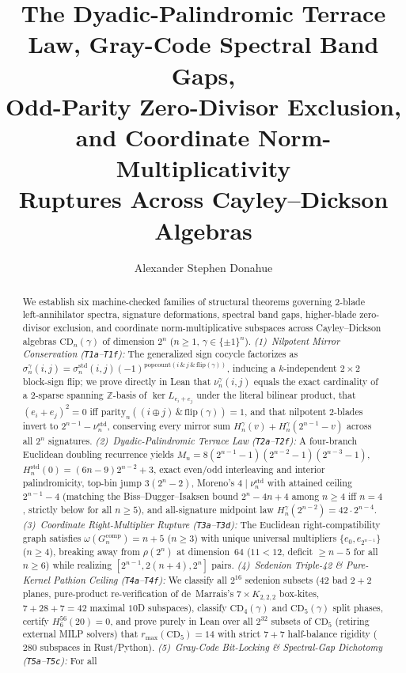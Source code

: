 \documentclass[11pt,reqno]{amsart}
\title[Terrace Law, Gray-Code Band Gaps, Odd-Parity Exclusion \& Ruptures]{%
  The Dyadic-Palindromic Terrace Law, Gray-Code Spectral Band Gaps,\\
  Odd-Parity Zero-Divisor Exclusion, and Coordinate Norm-Multiplicativity\\
  Ruptures Across Cayley--Dickson Algebras%
}
\author{Alexander Stephen Donahue}
\theoremstyle{plain}
\theoremstyle{definition}
\theoremstyle{remark}
\newcommand{\CD}{\mathrm{CD}}
\newcommand{\Z}{\mathbb{Z}}
\newcommand{\std}{\mathrm{std}}
\newcommand{\comp}{\mathrm{comp}}
\newcommand{\pop}{\mathrm{popcount}}
\newcommand{\parbit}{\mathrm{parity}}
\newcommand{\flip}{\mathrm{flip}}
\begin{document}
\begin{abstract}
We establish six machine-checked families of structural theorems governing $2$-blade
left-annihilator spectra, signature deformations, spectral band gaps, higher-blade zero-divisor
exclusion, and coordinate norm-multiplicative subspaces across Cayley--Dickson algebras
$\CD_n(\gamma)$ of dimension $2^n$ ($n \ge 1$, $\gamma \in \{\pm 1\}^n$).
\emph{(1)~Nilpotent Mirror Conservation (\texttt{T1a}--\texttt{T1f}):} The generalized sign
cocycle factorizes as $\sigma_n^\gamma(i,j) = \sigma_n^{\std}(i,j)(-1)^{\pop(i\,\&\,j\,\&\,\flip(\gamma))}$,
inducing a $k$-independent $2\times 2$ block-sign flip; we prove directly in Lean that
$\nu_n^\gamma(i,j)$ equals the exact cardinality of a $2$-sparse spanning $\Z$-basis of
$\ker L_{e_i+e_j}$ under the literal bilinear product, that $(e_i+e_j)^2=0$ iff
$\parbit_n((i\oplus j)\,\&\,\flip(\gamma))=1$, and that nilpotent $2$-blades invert to
$2^{n-1}-\nu_n^{\std}$, conserving every mirror sum $H_n^\gamma(v)+H_n^\gamma(2^{n-1}-v)$ across
all $2^n$ signatures.
\emph{(2)~Dyadic-Palindromic Terrace Law (\texttt{T2a}--\texttt{T2f}):} A four-branch Euclidean
doubling recurrence yields $M_n = 8(2^{n-1}-1)(2^{n-2}-1)(2^{n-3}-1)$,
$H_n^{\std}(0) = (6n-9)2^{n-2}+3$, exact even/odd interleaving and interior palindromicity,
top-bin jump $3(2^n-2)$, Moreno's $4 \mid \nu_n^{\std}$ with attained ceiling $2^{n-1}-4$
(matching the Biss--Dugger--Isaksen bound $2^n-4n+4$ among $n\ge 4$ iff $n=4$, strictly below
for all $n\ge 5$), and all-signature midpoint law $H_n^\gamma(2^{n-2}) = 42\cdot 2^{n-4}$.
\emph{(3)~Coordinate Right-Multiplier Rupture (\texttt{T3a}--\texttt{T3d}):} The Euclidean
right-compatibility graph satisfies $\omega(G_n^{\comp}) = n+5$ ($n\ge 3$) with unique universal
multipliers $\{e_0, e_{2^{n-1}}\}$ ($n\ge 4$), breaking away from $\rho(2^n)$ at dimension~$64$
($11 < 12$, deficit $\ge n-5$ for all $n\ge 6$) while realizing $[2^{n-1}, 2(n+4), 2^n]$ pairs.
\emph{(4)~Sedenion Triple-42 \& Pure-Kernel Pathion Ceiling (\texttt{T4a}--\texttt{T4f}):} We
classify all $2^{16}$ sedenion subsets ($42$ bad $2+2$ planes, pure-product re-verification of
de~Marrais's $7\times K_{2,2,2}$ box-kites, $7+28+7=42$ maximal $10$D subspaces), classify
$\CD_4(\gamma)$ and $\CD_5(\gamma)$ split phases, certify $H_6^{56}(20)=0$, and prove purely in
Lean over all $2^{32}$ subsets of $\CD_5$ (retiring external MILP solvers) that
$r_{\max}(\CD_5) = 14$ with strict $7+7$ half-balance rigidity ($280$ subspaces in Rust/Python).
\emph{(5)~Gray-Code Bit-Locking \& Spectral-Gap Dichotomy (\texttt{T5a}--\texttt{T5c}):} For all

\end{abstract}
\end{document}
